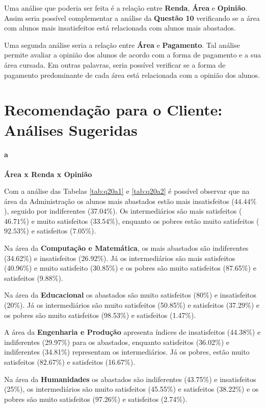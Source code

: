 \documentclass[10pt,a4paper,oneside]{article}
\newcommand{\adm}{Administração\xspace}
\begin{document}
Uma análise que poderia ser feita é a relação entre \textbf{Renda}, \textbf{Área} e \textbf{Opinião}. Assim seria possível complementar a análise da \textbf{Questão 10} verificando se a área com alunos mais 
insatisfeitos está relacionada com alunos mais abastados.

Uma segunda análise seria a relação entre \textbf{Área} e \textbf{Pagamento}. Tal análise permite avaliar a opinião dos alunos de acordo com a forma de pagamento e a sua área cursada. Em outras palavras, seria 
possível verificar se a forma de pagamento predominante de cada área está relacionada com a opinião dos alunos.

\FloatBarrier
\section{Recomendação para o Cliente: Análises Sugeridas}
\label{section:analises}

\paragraph{a}{\textbf{Área x Renda x Opinião}}

Com a análise das Tabelas \ref{tab:q20a1} e \ref{tab:q20a2} é possível observar que na área da \adm os alunos mais abastados estão mais insatisfeitos ($44.44\%$), seguido por 
indiferentes (37.04\%). Os intermediários são mais satisfeitos ($46.71\%$) e muito satisfeitos ($33.54\%$), enquanto os pobres estão muito satisfeitos ($92.53\%$) e satisfeitos ($7.05\%$).

Na área da \textbf{Computação e Matemática}, os mais abastados são indiferentes (34.62\%) e insatisfeitos (26.92\%). Já os intermediários são mais satisfeitos (40.96\%) e muito satisfeito (30.85\%) e 
os pobres são muito satisfeitos (87.65\%) e satisfeitos (9.88\%).

Na área da \textbf{Educacional} os abastados são muito satisfeitos (80\%) e insatisfeitos (20\%). Já os intermediários são muito satisfeitos (50.85\%) e satisfeitos (37.29\%) e os pobres são muito 
satisfeitos (98.53\%) e satisfeitos (1.47\%).

A área da \textbf{Engenharia e Produção} apresenta índices de insatisfeitos (44.38\%) e indiferentes (29.97\%) para os abastados, enquanto satisfeitos (36.02\%) e indiferentes (34.81\%) representam os intermediários.
Já os pobres, estão muito satisfeitos (82.67\%) e satisfeitos (16.67\%).

Na área da \textbf{Humanidades} os abastados são indiferentes (43.75\%) e insatisfeitos (25\%), os intermediários são muito satisfeitos (45.55\%) e satisfeitos (38.22\%) e os pobres são muito 
satisfeitos (97.26\%) e satisfeitos (2.74\%).
\end{document}
